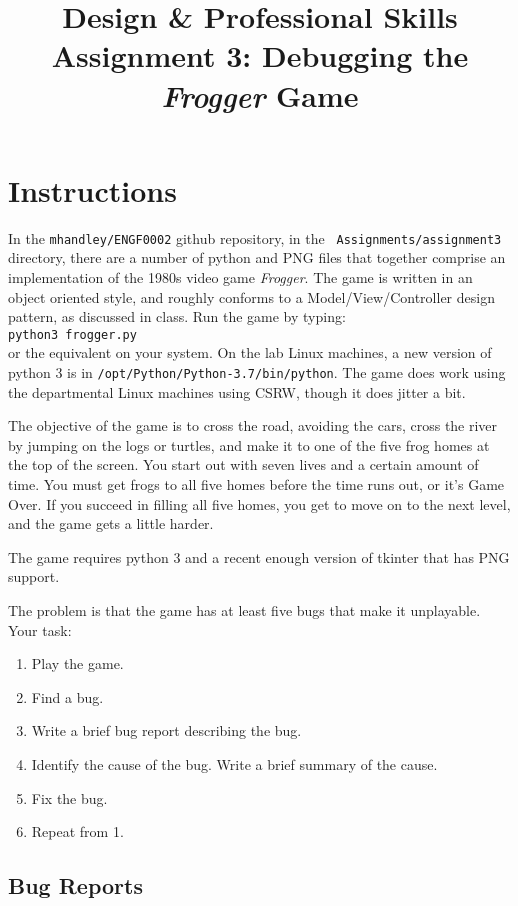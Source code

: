 \documentclass{article}
\title{Design \& Professional Skills\\
  Assignment 3: Debugging the {\em Frogger} Game}
\author{}
\date{}
\begin{document}
\maketitle

\section*{Instructions}

In the {\tt mhandley/ENGF0002} github repository, in the {\tt
  Assignments/assignment3} directory, there are a number of python and
PNG files that together comprise an implementation of the 1980s video
game \textit{Frogger}.  The game is written in an object oriented
style, and roughly conforms to a Model/View/Controller design pattern,
as discussed in class.  Run the game by typing:\\ \texttt{python3
  frogger.py}\\ or the equivalent on your system.  On the lab
Linux machines, a new version of python 3 is in
\texttt{/opt/Python/Python-3.7/bin/python}.  The game does work using
the departmental Linux machines using CSRW, though it does jitter a
bit.


The objective of the game is to cross the road, avoiding the cars,
cross the river by jumping on the logs or turtles, and make it to one
of the five frog homes at the top of the screen.  You start out with
seven lives and a certain amount of time.  You must get frogs to all
five homes before the time runs out, or it's Game Over.  If you
succeed in filling all five homes, you get to move on to the next
level, and the game gets a little harder.

The game requires python 3 and a recent enough version of tkinter that has PNG support.

The problem is that the game has at least five bugs that make it unplayable.  Your task:
\begin{enumerate}
\item Play the game.
\item Find a bug.
\item Write a brief bug report describing the bug.
\item Identify the cause of the bug.  Write a brief summary of the cause.
\item Fix the bug.
\item Repeat from 1.
\end{enumerate}

\subsection*{Bug Reports}
\end{document}
